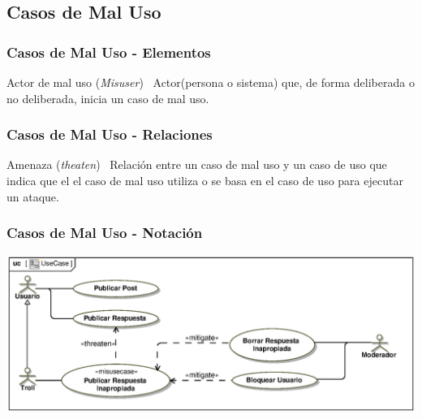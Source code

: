 \documentclass[handout,a4paper,slidestop,xcolor=pst,dvips,blue]{beamer}
\begin{document}
\subsection[Casos de Mal Uso]{Casos de Mal Uso}

\begin{frame}[c]
    \frametitle{Casos de Mal Uso - Elementos}
    \begin{block}{Actor de mal uso (\emph{Misuser})~\cite{Sindre2005}}
        Actor(persona o sistema) que, de forma deliberada o no deliberada, inicia un caso de mal uso.
    \end{block}
\end{frame}

\begin{frame}[c]
    \frametitle{Casos de Mal Uso - Relaciones}
    \begin{block}{Amenaza (\emph{theaten})~\cite{Sindre2005}}
        Relación entre un caso de mal uso y un caso de uso que indica que el el caso de mal uso utiliza o se basa en el caso de uso para ejecutar un ataque.
    \end{block}
\end{frame}

\begin{frame}[c]
    \frametitle{Casos de Mal Uso - Notación}
    \begin{center}	
        \includegraphics[width=\linewidth,keepaspectratio=true]{images/security/misusecase.eps}
    \end{center}
\end{frame}
\end{document}
